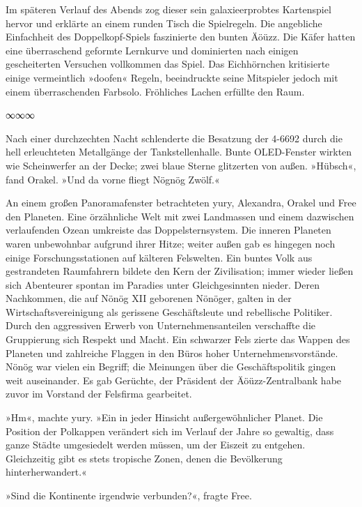 Im späteren Verlauf des Abends zog dieser sein galaxieerprobtes Kartenspiel hervor und erklärte an einem runden Tisch die Spielregeln. Die angebliche Einfachheit des Doppelkopf-Spiels faszinierte den bunten Äöüzz. Die Käfer hatten eine überraschend geformte Lernkurve und dominierten nach einigen gescheiterten Versuchen vollkommen das Spiel. Das Eichhörnchen kritisierte einige vermeintlich »doofen« Regeln, beeindruckte seine Mitspieler jedoch mit einem überraschenden Farbsolo. Fröhliches Lachen erfüllte den Raum.

\begin{center}
∞∞∞
\end{center}

Nach einer durchzechten Nacht schlenderte die Besatzung der 4-6692 durch die hell erleuchteten Metallgänge der Tankstellenhalle. Bunte OLED-Fenster wirkten wie Scheinwerfer an der Decke; zwei blaue Sterne glitzerten von außen. »Hübsch«, fand Orakel. »Und da vorne fliegt Nögnög Zwölf.«

An einem großen Panoramafenster betrachteten yury, Alexandra, Orakel und Free den Planeten. Eine örzähnliche Welt mit zwei Landmassen und einem dazwischen verlaufenden Ozean umkreiste das Doppelsternsystem. Die inneren Planeten waren unbewohnbar aufgrund ihrer Hitze; weiter außen gab es hingegen noch einige Forschungsstationen auf kälteren Felswelten. Ein buntes Volk aus gestrandeten Raumfahrern bildete den Kern der Zivilisation; immer wieder ließen sich Abenteurer spontan im Paradies unter Gleichgesinnten nieder. Deren Nachkommen, die auf Nönög XII geborenen Nönöger, galten in der Wirtschaftsvereinigung als gerissene Geschäftsleute und rebellische Politiker. Durch den aggressiven Erwerb von Unternehmensanteilen verschaffte die Gruppierung sich Respekt und Macht. Ein schwarzer Fels zierte das Wappen des Planeten und zahlreiche Flaggen in den Büros hoher Unternehmensvorstände. Nönög war vielen ein Begriff; die Meinungen über die Geschäftspolitik gingen weit auseinander. Es gab Gerüchte, der Präsident der Äöüzz-Zentralbank habe zuvor im Vorstand der Felsfirma gearbeitet.

»Hm«, machte yury. »Ein in jeder Hinsicht außergewöhnlicher Planet. Die Position der Polkappen verändert sich im Verlauf der Jahre so gewaltig, dass ganze Städte umgesiedelt werden müssen, um der Eiszeit zu entgehen. Gleichzeitig gibt es stets tropische Zonen, denen die Bevölkerung hinterherwandert.«

»Sind die Kontinente irgendwie verbunden?«, fragte Free.


